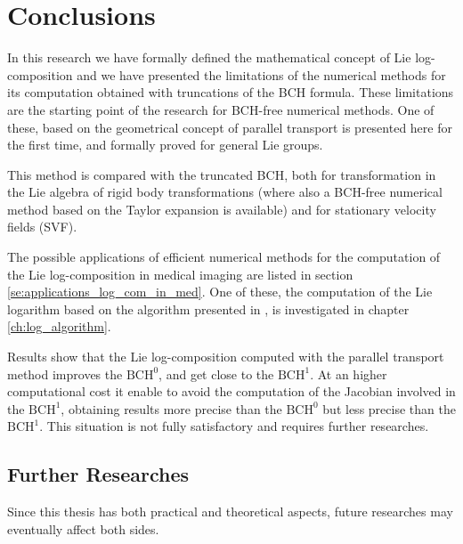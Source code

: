 
\chapter{Conclusions}\label{ch:conclusions}

In this research we have formally defined the mathematical concept of Lie log-composition and we have presented the limitations of the numerical methods for its computation obtained with truncations of the BCH formula. These limitations are the starting point of the research for BCH-free numerical methods. 
One of these, based on the geometrical concept of parallel transport is presented here for the first time, and formally proved for general Lie groups.

This method is compared with the truncated BCH, both for transformation in the Lie algebra of rigid body transformations (where also a BCH-free numerical method based on the Taylor expansion is available) and for stationary velocity fields (SVF).

The possible applications of efficient numerical methods for the computation of the Lie log-composition in medical imaging are listed in section \ref{se:applications_log_com_in_med}. One of these, the computation of the Lie logarithm based on the algorithm presented in \cite{bossa2008new}, is investigated in chapter \ref{ch:log_algorithm}.

Results show that the Lie log-composition computed with the parallel transport method improves the $\text{BCH}^0$, and get close to the $\text{BCH}^1$. At an higher computational cost it enable to avoid the computation of the Jacobian involved in the $\text{BCH}^1$, obtaining results more precise than the $\text{BCH}^0$ but less precise than the $\text{BCH}^1$. This situation is not fully satisfactory and requires further researches.


\section{Further Researches}\label{se:further_research}

Since this thesis has both practical and theoretical aspects, future researches may eventually affect both sides.

